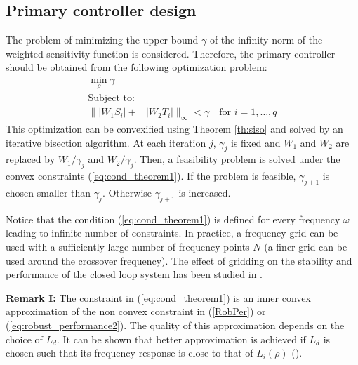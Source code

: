 \documentclass[default]{svmult}
\begin{document}
\subsection{Primary controller design}
The problem of minimizing the upper bound $\gamma$ of the infinity norm of the weighted sensitivity function is considered. Therefore, the primary controller should be obtained from the following optimization problem: 
\begin{eqnarray}\label{eq:min_hinf}
\min_{\rho} \gamma \nonumber \\\mbox{Subject to:}\\ \nonumber
 \|  |W_1S_i| +& |W_2T_i| \|_{\infty}<\gamma \quad \mbox{for } i=1,\dots,q\nonumber
\end{eqnarray}
This optimization can be convexified using Theorem \ref{th:siso} and solved by an iterative bisection algorithm. At each iteration $j$, $\gamma_j$ is fixed and $W_1$ and $W_2$ are replaced by $W_1/\gamma_j$ and $W_2/\gamma_j$. Then, a feasibility problem is solved under the convex constraints (\ref{eq:cond_theorem1}). If the problem is feasible, $\gamma_{j+1}$ is chosen smaller than $\gamma_{j}$. Otherwise $\gamma_{j+1}$ is increased.

Notice that the condition (\ref{eq:cond_theorem1}) is defined for every frequency $\omega$ leading to infinite number of constraints. In practice, a frequency  grid can be used  with a sufficiently large number of frequency points $N$ (a finer grid can be used around the crossover frequency). The effect of gridding on the stability and performance of the closed loop system has been studied in \cite{GKL10a}.

{\bf Remark I:} 
The constraint in (\ref{eq:cond_theorem1}) is an inner convex approximation of the non convex constraint in (\ref{RobPer}) or 
(\ref{eq:robust_performance2}). The quality of this approximation depends on the choice of $L_d$.  It can be shown that better approximation is achieved if $L_d$ is chosen such that its frequency response is close to that of $L_i(\rho)$ (\cite{KG10}). 
\end{document}
